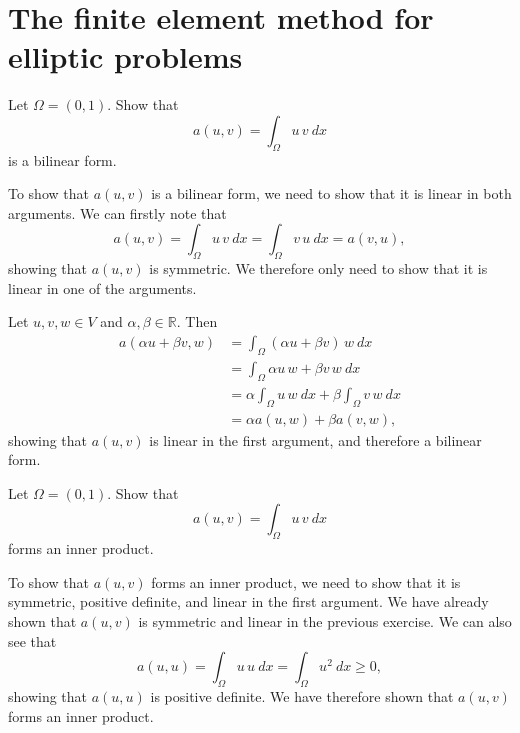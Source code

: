 \section{The finite element method for elliptic problems}

\begin{exercise}
    Let $\Omega = (0, 1)$.
    Show that
    \begin{equation*}
        a(u, v) = \int_\Omega u \, v \ dx
    \end{equation*}
    is a bilinear form.
\end{exercise}

\begin{solution}
    To show that $a(u, v)$ is a bilinear form, we need to show that it is linear in both arguments.
    We can firstly note that
    \begin{equation*}
        a(u, v) = \int_\Omega u \, v \ dx = \int_\Omega v \, u \ dx = a(v, u),
    \end{equation*}
    showing that $a(u, v)$ is symmetric.
    We therefore only need to show that it is linear in one of the arguments.

    Let $u, v, w \in V$ and $\alpha, \beta \in \mathbb{R}$.
    Then
    \begin{align*}
        a(\alpha u + \beta v, w) &= \int_\Omega (\alpha u + \beta v) \, w \ dx \\
        &= \int_\Omega \alpha u \, w + \beta v \, w \ dx \\
        &= \alpha \int_\Omega u \, w \ dx + \beta \int_\Omega v \, w \ dx \\
        &= \alpha a(u, w) + \beta a(v, w),
    \end{align*}
    showing that $a(u, v)$ is linear in the first argument, and therefore a bilinear form.
\end{solution}

\begin{exercise}
    Let $\Omega = (0, 1)$.
    Show that
    \begin{equation*}
        a(u, v) = \int_\Omega u \, v \ dx
    \end{equation*}
    forms an inner product.
\end{exercise}

\begin{solution}
    To show that $a(u, v)$ forms an inner product, we need to show that it is symmetric, positive definite, and linear in the first argument.
    We have already shown that $a(u, v)$ is symmetric and linear in the previous exercise.
    We can also see that
    \begin{equation*}
        a(u, u) = \int_\Omega u \, u \ dx = \int_\Omega u^2 \ dx \geq 0,
    \end{equation*}
    showing that $a(u, u)$ is positive definite.
    We have therefore shown that $a(u, v)$ forms an inner product.
\end{solution}

